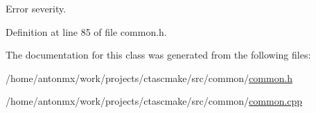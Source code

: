 Error severity. 



Definition at line 85 of file common.h.



The documentation for this class was generated from the following files:\begin{DoxyCompactItemize}
\item 
/home/antonmx/work/projects/ctascmake/src/common/\hyperlink{common_8h}{common.h}\item 
/home/antonmx/work/projects/ctascmake/src/common/\hyperlink{common_8cpp}{common.cpp}\end{DoxyCompactItemize}
